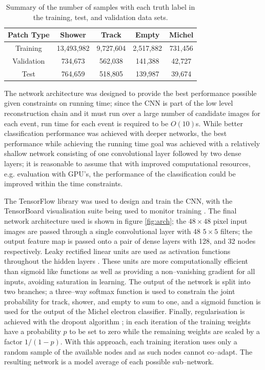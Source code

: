 \begin{table}[h]
	\centering
	\begin{tabular}{c|c|c|c|c}
		Patch Type & Shower     & Track     & Empty     & Michel  \\ \hline
		Training   & 13,493,982 & 9,727,604 & 2,517,882 & 731,456 \\
		Validation & 734,673    & 562,038   & 141,388   & 42,727  \\
		Test       & 764,659    & 518,805   & 139,987   & 39,674 
	\end{tabular}
	\caption[Number of patches with each truth label.]{Summary of the number of
	samples with each truth label in the training, test, and validation data
	sets.}
	\label{tab:patches}
\end{table}

The network architecture was designed to provide the best performance possible
given constraints on running time; since the CNN is part of the low level
reconstruction chain and it must run over a large number of candidate images for
each event, run time for each event is required to be \(O(10)\)s. While better
classification performance was achieved with deeper networks, the best
performance while achieving the running time goal was achieved with a relatively
shallow network consisting of one convolutional layer followed by two dense
layers; it is reasonable to assume that with improved computational resources,
e.g. evaluation with GPU's, the performance of the classification could be
improved within the time constraints. 

The TensorFlow library was used to design and train the CNN, with the
TensorBoard visualisation suite being used to monitor training \cite{45381}. The
final network architecture used is shown in figure \ref{fig:arch}; the
\(48\times48\) pixel input images are passed through a single convolutional
layer with 48 \(5\times5\) filters; the output feature map is passed onto a pair
of dense layers with 128, and 32 nodes respectively. Leaky rectified linear
units are used as activation functions throughout the hidden layers
\cite{He2015}. These units are more computationally efficient than sigmoid like
functions as well as providing a non--vanishing gradient for all inputs,
avoiding saturation in learning. The output of the network is split into two
branches; a three--way softmax function is used to constrain the joint
probability for track, shower, and empty to sum to one, and a sigmoid function
is used for the output of the Michel electron classifier. Finally,
regularisation is achieved with the dropout algorithm
\cite{Srivastava2014DropoutAS}; in each iteration of the training weights have a
probability \(p\) to be set to zero while the remaining weights are scaled by a
factor \(1/(1-p)\). With this approach, each training iteration uses only a
random sample of the available nodes and as such nodes cannot co--adapt. The
resulting network is a model average of each possible sub--network.

